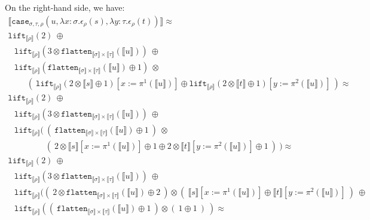 \documentclass[a4paper,UKenglish,cleveref,autoref,numberwithinsect]{lipics-v2019}
\theoremstyle{definition}
\newcommand{\abs}[2]{\lambda #1.#2}
\newcommand{\flatten}{\mathtt{flatten}}
\newcommand{\lift}{\mathtt{lift}}
\newcommand{\typeinterpret}[1]{\llbracket #1 \rrbracket}
\newcommand{\interpret}[1]{\llbracket #1 \rrbracket}
\begin{document}
\begin{itemize}
  On the right-hand side, we have:
  \[
  \begin{array}{l}
  \interpret{\mathtt{case}_{\sigma,\tau,\rho}(u,
  \abs{x:\sigma}{\epsilon_\rho(s)},\abs{y:\tau}{\epsilon_\rho(t)})}
  \approx \\
  \lift_{\typeinterpret{\rho}}(2)\ \oplus \\
  \phantom{A}
  \lift_{\typeinterpret{\rho}}(3 \otimes \flatten_{\typeinterpret{
    \sigma} \times \typeinterpret{\tau}}(\interpret{u}))\ \oplus \\
  \phantom{A}
  \lift_{\typeinterpret{\rho}}(\flatten_{\typeinterpret{\sigma} \times
    \typeinterpret{\tau}}(\interpret{u}) \oplus 1)\ \otimes \\
  \phantom{ABC}
    (\ \lift_{\typeinterpret{\rho}}(2 \otimes \interpret{s} \oplus 1)
      [x:=\pi^1(\interpret{u})]
      \oplus
     \lift_{\typeinterpret{\rho}}(2 \otimes \interpret{t} \oplus 1)
      [y:=\pi^2(\interpret{u})]
    \ ) \approx \\
  \lift_{\typeinterpret{\rho}}(2)\ \oplus \\
  \phantom{A}
  \lift_{\typeinterpret{\rho}}(3 \otimes \flatten_{\typeinterpret{
    \sigma} \times \typeinterpret{\tau}}(\interpret{u}))\ \oplus \\
  \phantom{A}
  \lift_{\typeinterpret{\rho}}(\ (\ \flatten_{\typeinterpret{\sigma} \times
    \typeinterpret{\tau}}(\interpret{u}) \oplus 1\ )\ \otimes \\
  \phantom{ABCDEF}
    (\ 2 \otimes \interpret{s}[x:=\pi^1(\interpret{u})] \oplus 1
       \oplus
       2 \otimes \interpret{t}[y:=\pi^2(\interpret{u})] \oplus 1
    \ )\ ) \approx \\
  \lift_{\typeinterpret{\rho}}(2)\ \oplus \\
  \phantom{A}
  \lift_{\typeinterpret{\rho}}(3 \otimes \flatten_{\typeinterpret{
    \sigma} \times \typeinterpret{\tau}}(\interpret{u}))\ \oplus \\
  \phantom{A}
  \lift_{\typeinterpret{\rho}}((\ 2 \otimes \flatten_{\typeinterpret{
    \sigma} \times \typeinterpret{\tau}}(\interpret{u}) \oplus 2\ )
    \otimes (\ \interpret{s}[x:=\pi^1(\interpret{u})] \oplus
    \interpret{t}[y:=\pi^2(\interpret{u})]\ )\ \oplus \\
  \phantom{A}
  \lift_{\typeinterpret{\rho}}((\ \flatten_{\typeinterpret{\sigma} \times
    \typeinterpret{\tau}}(\interpret{u}) \oplus 1\ ) \otimes
    (\ 1 \oplus 1\ )\ ) \approx \\
  \end{array}
  \]
  \[
  \begin{array}{l}

\end{array}\]
\end{itemize}
\end{document}
